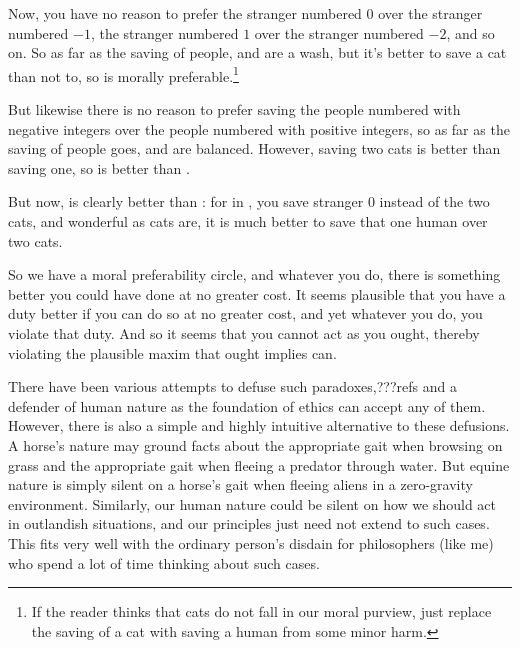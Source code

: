 Now, you have no reason to prefer
the stranger numbered $0$ over the stranger numbered $-1$, the stranger numbered $1$ over the
stranger numbered $-2$, and so on. So as far as the saving of people,  and 
are a wash, but it's better to save a cat than not to, so  is morally preferable.\footnote{If the
reader thinks that cats do not fall in our moral purview, just replace the saving of a cat with saving a human
from some minor harm.}

But likewise there is no reason to prefer saving the people numbered with negative integers over the
people numbered with positive integers, so as far as the saving of people goes,  and
 are balanced. However, saving two cats is better than saving one, so 
is better than . 

But now,  is clearly better than : for in , you save stranger
$0$ instead of the two cats, and wonderful as cats are, it is much better to save that one human over two cats. 

So we have a moral preferability circle, and whatever you do, there is something better you could have
done at no greater cost. It seems plausible that you have a duty better if you can do so at no greater
cost, and yet whatever you do, you violate that duty. And so it seems that you cannot act as you ought,
thereby violating the plausible maxim that ought implies can.

There have been various attempts to defuse such paradoxes,???refs and a defender of human nature as the
foundation of ethics can accept any of them. However, there is also a simple and highly intuitive 
alternative to these defusions. A horse's nature may ground facts about the appropriate gait when
browsing on grass and the appropriate gait when fleeing a predator through water. But equine nature
is simply silent on a horse's gait when fleeing aliens in a zero-gravity environment. Similarly,
our human nature could be silent on how we should act in outlandish situations, and our
principles just need not extend to such cases. This fits very well with the ordinary person's
disdain for philosophers (like me) who spend a lot of time thinking about such cases. 

